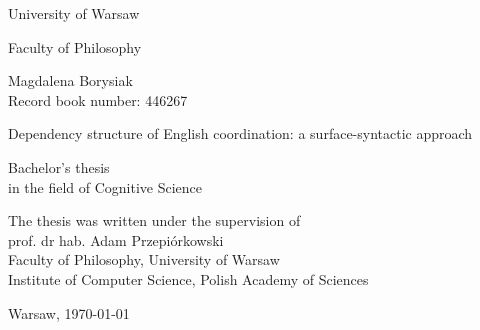 \begin{titlepage}
	\begin{center}
		\vspace*{1.5cm}
		
		{\huge University of Warsaw}
		
		\vspace{0.1cm}
		{\Large Faculty of Philosophy}
		
		\vspace{3.5cm}
		
		{\Large Magdalena Borysiak} \\ Record book number: 446267
		
		\vspace{2cm}
		
		{\huge Dependency structure of English coordination: a surface-syntactic approach}
		
		
		\vspace{3cm}
		
		{\large Bachelor's thesis \\ in the field of Cognitive Science}
	\end{center}
	
	\vspace{2.5cm}
	
	\begin{flushright}
		The thesis was written under the supervision of \\
		prof. dr hab. Adam Przepiórkowski \\
		Faculty of Philosophy, University of Warsaw \\
		Institute of Computer Science, Polish Academy of Sciences	
	\end{flushright}
	
	\vspace{1.5cm}
	
	\begin{center}
		Warsaw, \monthyeardate\today
	\end{center}	
\end{titlepage}